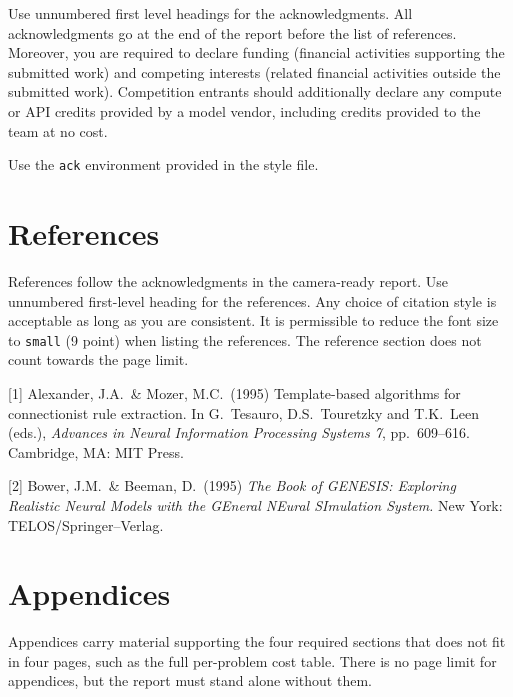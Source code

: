 \documentclass{article}
\begin{document}
\begin{ack}
Use unnumbered first level headings for the acknowledgments. All acknowledgments
go at the end of the report before the list of references. Moreover, you are
required to declare funding (financial activities supporting the submitted work)
and competing interests (related financial activities outside the submitted
work). Competition entrants should additionally declare any compute or API
credits provided by a model vendor, including credits provided to the team at no
cost.

Use the \texttt{ack} environment provided in the style file.
\end{ack}

\section*{References}


References follow the acknowledgments in the camera-ready report. Use unnumbered
first-level heading for the references. Any choice of citation style is
acceptable as long as you are consistent. It is permissible to reduce the font
size to \verb+small+ (9 point) when listing the references. The reference section
does not count towards the page limit.
\medskip


{
\small


[1] Alexander, J.A.\ \& Mozer, M.C.\ (1995) Template-based algorithms for
connectionist rule extraction. In G.\ Tesauro, D.S.\ Touretzky and T.K.\ Leen
(eds.), {\it Advances in Neural Information Processing Systems 7},
pp.\ 609--616. Cambridge, MA: MIT Press.


[2] Bower, J.M.\ \& Beeman, D.\ (1995) {\it The Book of GENESIS: Exploring
  Realistic Neural Models with the GEneral NEural SImulation System.}  New York:
TELOS/Springer--Verlag.
}



\appendix

\section{Appendices}
Appendices carry material supporting the four required sections that does not fit
in four pages, such as the full per-problem cost table. There is no page limit for
appendices, but the report must stand alone without them.

\end{document}
